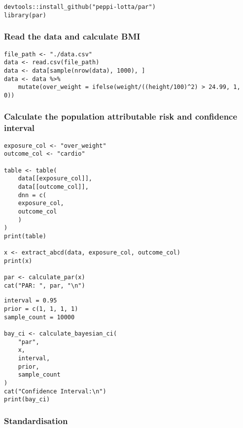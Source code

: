 \begin{lstlisting}
devtools::install_github("peppi-lotta/par")
library(par)
\end{lstlisting}

\subsubsection{Read the data and calculate BMI}

\begin{lstlisting}
file_path <- "./data.csv"
data <- read.csv(file_path)
data <- data[sample(nrow(data), 1000), ]
data <- data %>%
    mutate(over_weight = ifelse(weight/((height/100)^2) > 24.99, 1, 0))
\end{lstlisting}

\subsubsection{Calculate the population attributable risk and confidence interval}

\begin{lstlisting}
exposure_col <- "over_weight"
outcome_col <- "cardio"

table <- table(
    data[[exposure_col]],
    data[[outcome_col]],
    dnn = c(
    exposure_col,
    outcome_col
    )
)
print(table)

x <- extract_abcd(data, exposure_col, outcome_col)
print(x)

par <- calculate_par(x)
cat("PAR: ", par, "\n")
\end{lstlisting}

\begin{lstlisting}
interval = 0.95
prior = c(1, 1, 1, 1)
sample_count = 10000

bay_ci <- calculate_bayesian_ci(
    "par",
    x,
    interval,
    prior,
    sample_count
)
cat("Confidence Interval:\n")
print(bay_ci)
\end{lstlisting}

\subsubsection{Standardisation}

